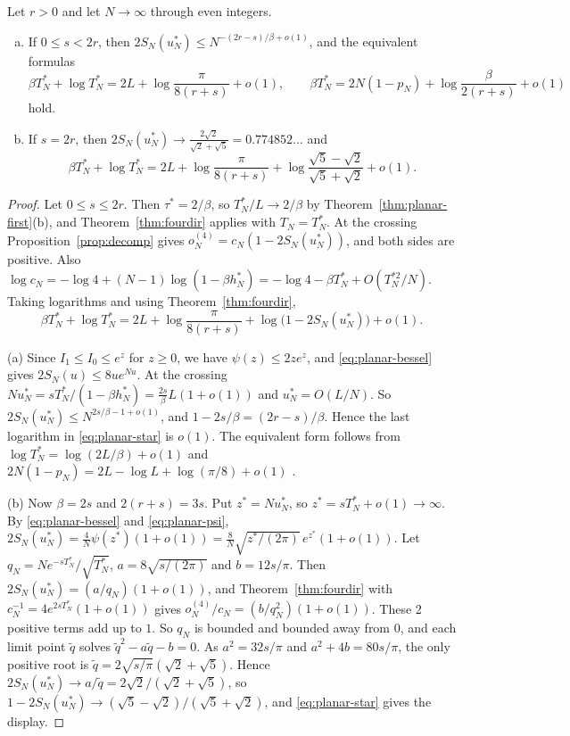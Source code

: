 \begin{corollary}\label{cor:planar-turn}
Let $r>0$ and let $N\to\infty$ through even integers.
\begin{enumerate}[(a)]
\item If $0\le s<2r$, then $2S_N(u^*_N)\le N^{-(2r-s)/\beta+o(1)}$, and the equivalent formulas
\[
 \beta T^*_N+\log T^*_N=2L+\log\frac\pi{8(r+s)}+o(1),\qquad
 \beta T^*_N=2N(1-p_N)+\log\frac\beta{2(r+s)}+o(1)
\]
hold.
\item If $s=2r$, then $2S_N(u^*_N)\to\frac{2\sqrt2}{\sqrt2+\sqrt5}=0.774852\ldots$ and
\[
 \beta T^*_N+\log T^*_N=2L+\log\frac\pi{8(r+s)}
 +\log\frac{\sqrt5-\sqrt2}{\sqrt5+\sqrt2}+o(1).
\]
\end{enumerate}
\end{corollary}

\begin{proof}
Let $0\le s\le2r$. Then $\tau^*=2/\beta$, so $T^*_N/L\to2/\beta$ by
Theorem~\ref{thm:planar-first}(b), and Theorem~\ref{thm:fourdir} applies with $T_N=T^*_N$. At the
crossing Proposition~\ref{prop:decomp} gives $o^{(4)}_N=c_N(1-2S_N(u^*_N))$, and both sides are
positive. Also $\log c_N=-\log4+(N-1)\log(1-\beta h^*_N)=-\log4-\beta T^*_N+O(T^{*2}_N/N)$. Taking
logarithms and using Theorem~\ref{thm:fourdir},
\begin{equation}\label{eq:planar-star}
 \beta T^*_N+\log T^*_N=2L+\log\frac\pi{8(r+s)}+\log\bigl(1-2S_N(u^*_N)\bigr)+o(1).
\end{equation}

(a) Since $I_1\le I_0\le e^z$ for $z\ge0$, we have $\psi(z)\le2ze^z$, and \eqref{eq:planar-bessel}
gives $2S_N(u)\le8ue^{Nu}$. At the crossing $Nu^*_N=sT^*_N/(1-\beta h^*_N)=\frac{2s}\beta L(1+o(1))$
and $u^*_N=O(L/N)$. So $2S_N(u^*_N)\le N^{2s/\beta-1+o(1)}$, and $1-2s/\beta=(2r-s)/\beta$. Hence the
last logarithm in \eqref{eq:planar-star} is $o(1)$. The equivalent form follows from
$\log T^*_N=\log(2L/\beta)+o(1)$ and $2N(1-p_N)=2L-\log L+\log(\pi/8)+o(1)$
\cite[Eq.~(7)]{paperA}.

(b) Now $\beta=2s$ and $2(r+s)=3s$. Put $z^*=Nu^*_N$, so $z^*=sT^*_N+o(1)\to\infty$. By
\eqref{eq:planar-bessel} and \eqref{eq:planar-psi},
$2S_N(u^*_N)=\frac4N\psi(z^*)(1+o(1))=\frac8N\sqrt{z^*/(2\pi)}\,e^{z^*}(1+o(1))$. Let
$q_N=Ne^{-sT^*_N}/\sqrt{T^*_N}$, $a=8\sqrt{s/(2\pi)}$ and $b=12s/\pi$. Then
$2S_N(u^*_N)=(a/q_N)(1+o(1))$, and Theorem~\ref{thm:fourdir} with
$c_N^{-1}=4e^{2sT^*_N}(1+o(1))$ gives $o^{(4)}_N/c_N=(b/q_N^2)(1+o(1))$. These 2 positive terms add
up to $1$. So $q_N$ is bounded and bounded away from $0$, and each limit point $\tilde q$ solves
$\tilde q^2-a\tilde q-b=0$. As $a^2=32s/\pi$ and $a^2+4b=80s/\pi$, the only positive root is
$\tilde q=2\sqrt{s/\pi}(\sqrt2+\sqrt5)$. Hence $2S_N(u^*_N)\to a/\tilde q=2\sqrt2/(\sqrt2+\sqrt5)$,
so $1-2S_N(u^*_N)\to(\sqrt5-\sqrt2)/(\sqrt5+\sqrt2)$, and \eqref{eq:planar-star} gives the display.
\end{proof}

